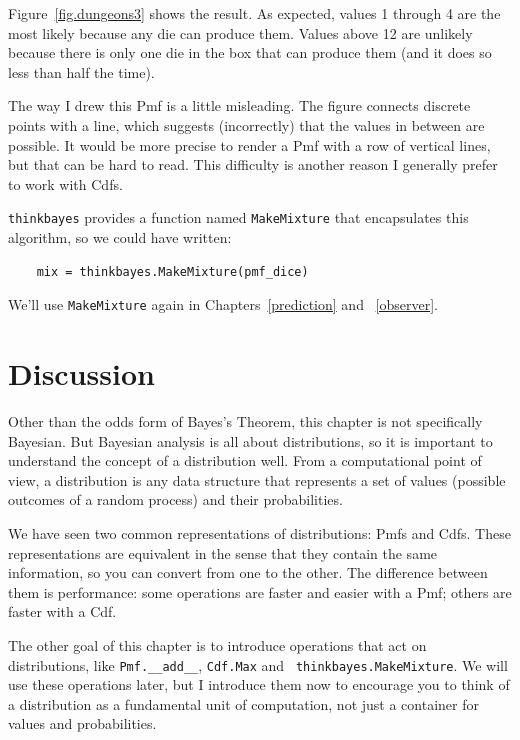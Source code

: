 \documentclass[12pt]{book}
\begin{document}
Figure~\ref{fig.dungeons3} shows the result.  As expected, values 1
through 4 are the most likely because any die can produce them.
Values above 12 are unlikely because there is only one die in the box
that can produce them (and it does so less than half the time).

The way I drew this Pmf is a little misleading.  The figure connects
discrete points with a line, which suggests (incorrectly) that the
values in between are possible.  It would be more precise to render a
Pmf with a row of vertical lines, but that can be hard to read.  This
difficulty is another reason I generally prefer to work with Cdfs.

{\tt thinkbayes} provides a function named {\tt MakeMixture}
that encapsulates this algorithm, so we could have written:

\begin{verbatim}
    mix = thinkbayes.MakeMixture(pmf_dice)
\end{verbatim}

We'll use {\tt MakeMixture} again in Chapters~\ref{prediction} and
~\ref{observer}.


\section{Discussion}

Other than the odds form of Bayes's Theorem, this chapter is not
specifically Bayesian.  But Bayesian analysis is all about
distributions, so it is important to understand the concept of a
distribution well.  From a computational point of view, a distribution
is any data structure that represents a set of values (possible
outcomes of a random process) and their probabilities.

We have seen two common representations of distributions: Pmfs
and Cdfs.  These representations are equivalent in the sense that
they contain the same information, so you can convert from one
to the other.  The difference between them is performance: some
operations are faster and easier with a Pmf; others are faster
with a Cdf.

The other goal of this chapter is to introduce operations that act on
distributions, like \verb"Pmf.__add__", {\tt Cdf.Max} and {\tt
  thinkbayes.MakeMixture}.  We will use these operations later, but I
introduce them now to encourage you to think of a distribution as a
fundamental unit of computation, not just a container for values and
probabilities.
\end{document}
